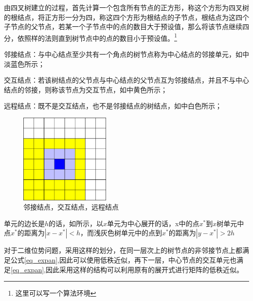 由四叉树建立的过程，首先计算一个包含所有节点的正方形，称这个方形为四叉树的根结点，将正方形一分为四，称这四个方形为根结点的子节点，根结点为这四个子节点的父节点，若某一个子节点中的点的数目大于预设值，那么将该节点继续四分，依照样的法则直到树节点中的点的数目小于预设值。\footnote{这里可以写一个算法环境}

\begin{definition}
	邻接结点：与中心结点至少共有一个角点的树节点称为中心结点的邻接单元，如中淡蓝色所示； 
\end{definition}

\begin{definition}
	交互结点：若该树结点的父节点与中心结点的父节点互为邻接结点，并且不与中心结点的邻接，则称该节点为交互节点，如中黄色所示；
\end{definition}

\begin{definition}
	远程结点：既不是交互结点，也不是邻接结点的树结点，如中白色所示；
\end{definition}
\begin{figure}[htbp]
	\begin{center}
		\includegraphics[width=0.4\textwidth]{pics/nabor.eps}
	\end{center}
	\caption{邻接结点，交互结点，远程结点}
	\label{fignodetype}
\end{figure}
单元的边长是$h$的话，如所示，以$x$单元为中心展开的话，x中的点$x^*$到$x$树单元中点$x^*$的距离为$|x - x^*| < h$，而浅灰色树单元中的点到$x^*$的距离为$|y - x^*| > 2h$

对于二维位势问题，采用这样的划分，在同一层次上的树节点的非邻接节点上都满足公式\eqref{eq_expan},因此可以使用低秩近似，再下一层，中心节点的交互单元也满足\eqref{eq_expan},因此采用这样的结构可以利用原有的展开式进行矩阵的低秩近似。

